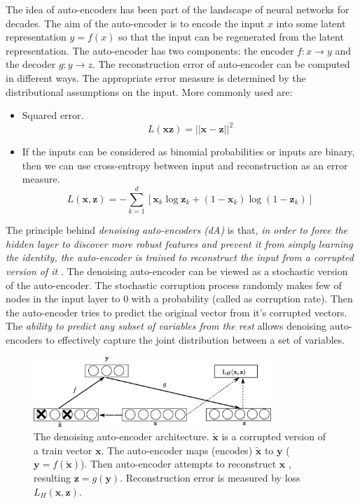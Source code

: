 The idea of auto-encoders has been part of the landscape of neural networks for decades. The aim of the auto-encoder is to encode the input $x$ into some latent representation $y = f(x)$ so that the input can be regenerated from the latent representation. The auto-encoder has two components: the encoder $f:x \rightarrow y$ and the decoder $g:y \rightarrow z$. The reconstruction error of auto-encoder can be computed in different ways. The appropriate error measure is determined by the distributional assumptions on the input. More commonly used are:
\begin{itemize}
\item Squared error.
$$ L(\mathbf{x} \mathbf{z}) = || \mathbf{x} - \mathbf{z} ||^2$$
\item If the inputs can be considered as binomial probabilities or inputs are binary, then we can use cross-entropy between input and reconstruction as an error measure.
$$L(\mathbf{x}, \mathbf{z}) = - \sum^d_{k=1}[\mathbf{x}_k \log \mathbf{z}_k + (1 - \mathbf{x}_k)\log(1 - \mathbf{z}_k)]$$
\end{itemize}

The principle behind \emph{denoising auto-encoders (dA)} is that, \textit{in order to force the hidden layer to discover more robust features and prevent it from simply learning the identity, the auto-encoder is trained to reconstruct the input from a corrupted version of it} \cite{vincent2008extracting}. The denoising auto-encoder can be viewed as a stochastic version of the auto-encoder. The stochastic corruption process randomly makes few of nodes in the input layer to $0$ with a probability (called as corruption rate). Then the auto-encoder tries to predict the original vector from it's corrupted vectors. The \textit{ability to predict any subset of variables from the rest} allows denoising auto-encoders to effectively capture the joint distribution between a set of variables.

\begin{figure}[ht]
\centering
\includegraphics[width=0.8\textwidth]{./imgs/sda.eps}
\caption[The denoising auto-encoder architecture]{The denoising auto-encoder architecture. $\mathbf{\tilde{x}}$ is a corrupted version of a train vector $\mathbf{x}$. The auto-encoder maps (encodes) $\mathbf{\tilde{x}}$ to $\mathbf{y}$ ($\mathbf{y} = f(\mathbf{\tilde{x}})$). Then auto-encoder attempts to reconstruct $\mathbf{x}$ , resulting $ \mathbf{z} = g(\mathbf{y}) $. Reconstruction error is measured by loss $L_{H}(\mathbf{x},\mathbf{z})$. }
\label{fig:sdaChain}
\end{figure}

